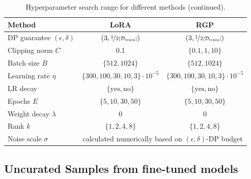 \begin{table}[H]
    \centering
    \setlength{\tabcolsep}{7pt}
    \renewcommand{\arraystretch}{1.2}
    \caption{Hyperparameter search range for different methods (continued).}
    \begin{tabular}{@{} l c c @{}}
        \toprule
        Method & LoRA & RGP \\
        \midrule
        DP guarantee $(\epsilon, \delta)$ &
        $(3, \nicefrac{1}{2|\mathcal{D}_{\text{train}}|})$ & 
        $(3, \nicefrac{1}{2|\mathcal{D}_{\text{train}}|})$ \\
        Clipping norm $C$ &0.1 & $\{ 0.1, 1, 10\}$ \\
        Batch size $B$ 
        &$\{512, 1024\}$ 
        &$\{512, 1024\}$ \\
        Learning rate $\eta$ & 
        $ \{300, 100, 30, 10, 3\} \cdot 10^{-5}$ & 
        $\{300, 100, 30, 10, 3\} \cdot 10^{-5}$ \\
        LR decay
        & $\{ \text{yes}, \text{no}\}$ 
        & $\{ \text{yes}, \text{no}\}$ \\
        Epochs $E$
        &$\{5, 10, 30, 50\}$
        & $\{5, 10, 30, 50\}$\\
        Weight decay $\lambda$ & 0 & 0 \\
        Rank $k$ 
        &$\{1,2, 4,8\}$ & $\{1,2,4, 8\}$ \\
        Noise scale $\sigma$ & 
        \multicolumn{2}{c}{calculated numerically based on $(\epsilon, \delta)$-DP budget} \\
        \bottomrule
        \end{tabular}
        \label{tab:hparams_low_rank}
\end{table}


\newpage
\subsection{Uncurated Samples from fine-tuned models}\label{app:samples}

